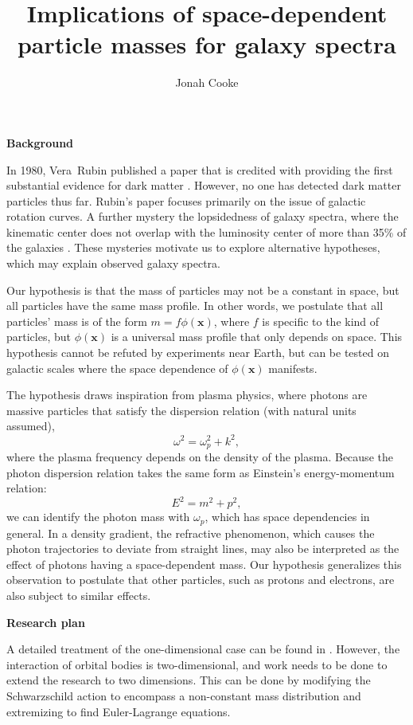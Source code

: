 \documentclass{article}
\title{Implications of space-dependent particle masses for galaxy spectra}
\author{Jonah Cooke}
\affil{Advisor: Yuan Shi}
\affil{Plasma Quantum Group}
\affil{Department of Physics, University of Colorado at Boulder}
\let\cite\parencite
\begin{document}
\maketitle
\textbf{Background}

In 1980, Vera~Rubin published a paper that is credited with providing the first substantial evidence for dark matter \cite{rubinRotationalProperties211980}. However, no one has detected dark matter particles thus far. Rubin's paper focuses primarily on the issue of galactic rotation curves. A further mystery the lopsidedness of galaxy spectra, where the kinematic center does not overlap with the luminosity center of more than 35\% of the galaxies \cite{jogLopsidedSpiralGalaxies2009a, garcia-lorenzoIonizedGasKinematics}. These mysteries motivate us to explore alternative hypotheses, which may explain observed galaxy spectra.


Our hypothesis is that the mass of particles may not be a constant in space, but all particles have the same mass profile. In other words, we postulate that all particles' mass is of the form $m=f\phi(\mathbf{x})$, where $f$ is specific to the kind of particles, but $\phi(\mathbf{x})$ is a universal mass profile that only depends on space. This hypothesis cannot be refuted by experiments near Earth, but can be tested on galactic scales where the space dependence of $\phi(\mathbf{x})$ manifests. 

The hypothesis draws inspiration from plasma physics, where photons are massive particles that satisfy the dispersion relation (with natural units assumed),
\[\omega^2 = \omega_p^2 +k^2,\]
where the plasma frequency depends on the density of the plasma.
Because the photon dispersion relation takes the same form as Einstein's energy-momentum relation:
\[E^2 = m^2+p^2,\]
we can identify the photon mass with $\omega_p$, which has space dependencies in general.  
In a density gradient, the refractive phenomenon, which causes the photon trajectories to deviate from straight lines, may also be interpreted as the effect of photons having a space-dependent mass. 
Our hypothesis generalizes this observation to postulate that other particles, such as protons and electrons, are also subject to similar effects. 


\textbf{Research plan}

A detailed treatment of the one-dimensional case can be found in \cite{shiForceMetricMass2021}. However, the interaction of orbital bodies is two-dimensional, and work needs to be done to extend the research to two dimensions. This can be done by modifying the Schwarzschild action to encompass a non-constant mass distribution and extremizing to find Euler-Lagrange equations.
\end{document}

